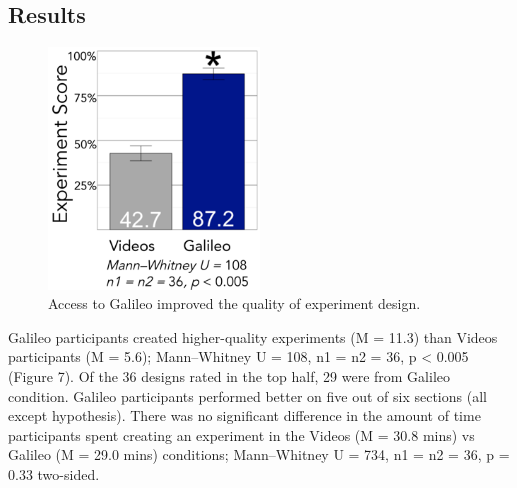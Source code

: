\subsection{Results}

\begin{figure}[h] 
  \includegraphics[width=0.5\textwidth]{figures/galileo/galileo-study1-7}
  \caption[]
{Access to Galileo improved the quality of experiment design. }
  \label{fig:galileo-result}
\end{figure}

Galileo participants created higher-quality experiments (M = 11.3) than Videos participants (M = 5.6); Mann–Whitney U = 108, n1 = n2 = 36, p < 0.005 (Figure 7). Of the 36 designs rated in the top half, 29 were from Galileo condition. Galileo participants performed better on five out of six sections (all except hypothesis). There was no significant difference in the amount of time participants spent creating an experiment in the Videos (M = 30.8 mins) vs Galileo (M = 29.0 mins) conditions; Mann–Whitney U = 734, n1 = n2 = 36, p = 0.33 two-sided. 


